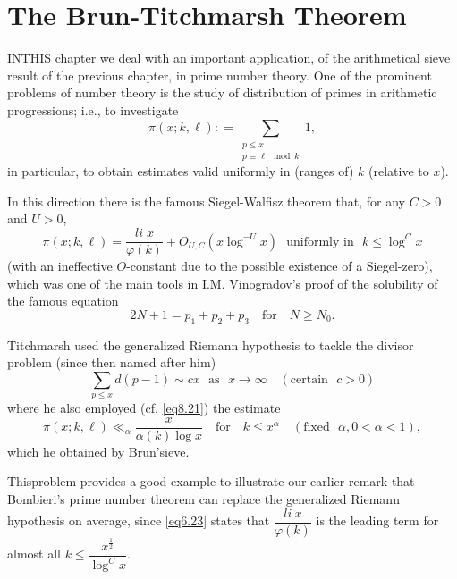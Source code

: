 
\chapter{The Brun-Titchmarsh Theorem}\label{chap8} %

IN\pageoriginale THIS	chapter we deal with an important application, of the
arithmetical sieve result of the previous chapter, in prime number
theory. One of the prominent problems of number theory is the study of
distribution of primes in arithmetic progressions; i.e., to investigate  
\begin{equation*}
\pi (x;k,\ell ): = \sum_{\substack {p \leq x \\ { p \equiv \ell \mod
      k}}} 1 , \tag{8.1}\label{eq8.1} 
\end{equation*}
in particular, to obtain estimates valid uniformly in (ranges of) $k$
(relative to $x$).  

In this direction there is the famous Siegel-Walfisz theorem that,
for any $C > 0$ and $U > 0$, 
\begin{equation*}
\pi (x;k,\ell)= \frac{li \; x}{\varphi (k)} + O_{U,C}(x \log^{-U} x)
\text{~ uniformly in~ } k \leq \log^C x \tag{8.2}\label{eq8.2} 
\end{equation*}
(with an ineffective $O$-constant due to the possible existence of a
Siegel-zero), which was one of the main tools in I.M. Vinogradov's
proof of the solubility of the famous equation 
\begin{equation*}
2N + 1 = p_1 + p_2 + p_3 \quad \text{for}\quad N \geq
N_0. \tag{8.3}\label{eq8.3}  
\end{equation*}

Titchmarsh used the generalized Riemann hypothesis to tackle the
divisor problem (since then named after him) 
\begin{equation*}
\sum_{p \leq x} d(p-1) \sim cx \text{~ as~ } x \to \infty \quad
(\text{certain~ } c > 0) \tag{8.4}\label{eq8.4} 
\end{equation*}
where he also employed (cf. \eqref{eq8.21}) the estimate
\begin{equation*}
\pi (x;k,\ell ) \ll_\alpha \frac{x}{\alpha (k) \log x}\quad
\text{for}\quad k
\leq x^\alpha\quad (\text{fixed~ } \alpha , 0 < \alpha < 1 ),
\tag{8.5}\label{eq8.5}  
\end{equation*}
which he obtained by Brun'sieve.

This\pageoriginale problem provides a good example to illustrate our
earlier remark 
that Bombieri's prime number theorem can replace the generalized
Riemann hypothesis on average, since \eqref{eq6.23} states that $\dfrac{li\
  x}{\varphi(k)}$ is the leading term for almost all $k \leq
\dfrac{x^{\frac{1}{2}}}{\log^C x}$. 

